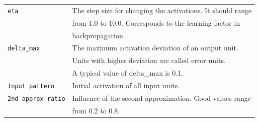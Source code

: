 {\newpage
\clearpage
\samepage \begin{tabular}{ll}

{\tt eta} & The step size for changing the activations. It should
range\\  & from 1.0 to 10.0. Corresponds to the learning
factor in\\  & backpropagation.\\ 

{\tt delta\_max} & The maximum activation deviation of an
output unit.\\  & Units with higher deviation are called error units.\\ 
& A typical value of delta\_max is 0.1.\\ 

{\tt Input pattern}
                 & Initial activation of all input units.\\ 
{\tt 2nd approx ratio}
                 & Influence of the second approximation. Good values
range\\  & from 0.2 to 0.8.\\ 
\end{tabular}
}

{\newpage
\clearpage
\samepage {}
}

{\newpage
\clearpage
\samepage {}
}

{\newpage
\clearpage
\samepage \begin{figure}[htb]
\begin{center}

  \begin{minipage}[htb]{9cm}
  \end{minipage}
  \hfill
  \begin{minipage}[hbt]{5cm}
  \end{minipage}
  

\end{center}
\end{figure}
}

{\newpage
\clearpage
\samepage {}
}

